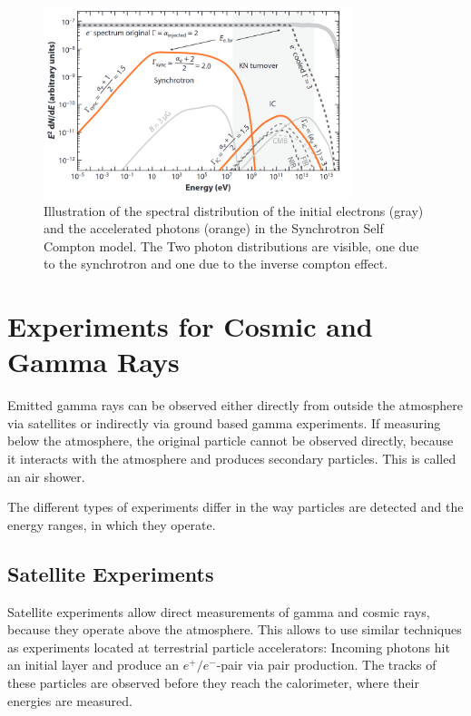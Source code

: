 \begin{figure}
	\centering
	\captionsetup{width=0.9\linewidth}
	\includegraphics[width=0.8\textwidth]{images/sct_spectrum.png}
	\caption{Illustration of the spectral distribution of 
	the initial electrons (gray) and the accelerated photons (orange)
	in the Synchrotron Self Compton model.
	The 
	Two photon distributions are visible, one due to the synchrotron and one  
	due to the inverse compton effect.
	}
	\label{fig:sct_model}
\end{figure}



\section{Experiments for Cosmic and Gamma Rays}
Emitted gamma rays can be observed either directly
from outside the atmosphere via satellites or indirectly
via ground based gamma experiments.
If measuring below the atmosphere, the original particle
cannot be observed directly, because it interacts with the atmosphere
and produces secondary particles. This is called an air shower.

The different types of experiments differ in the way particles are detected and
the energy ranges, in which they operate.

\subsection{Satellite Experiments}
Satellite experiments allow direct measurements of gamma and cosmic rays, because they operate
above the atmosphere.
This allows to use similar techniques as experiments located at terrestrial 
particle accelerators: Incoming photons hit an initial layer and produce an $e^+/e^-$-pair 
via pair production. The tracks of these particles are observed before they reach the calorimeter,
where their energies are measured.


